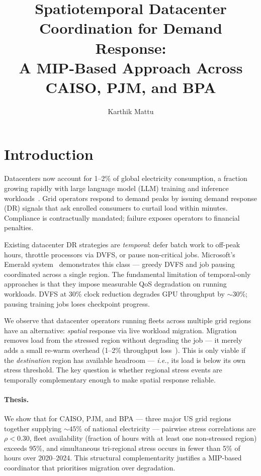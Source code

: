 \documentclass[sigplan,10pt,review]{acmart}
\title{Spatiotemporal Datacenter Coordination for Demand Response:\\
       A MIP-Based Approach Across CAISO, PJM, and BPA}
\author{Karthik Mattu}
\affiliation{\institution{Rochester Institute of Technology}}
\newcommand{\ie}{\textit{i.e.,}\xspace}
\begin{document}
\maketitle

\section{Introduction}
\label{sec:intro}

Datacenters now account for 1--2\% of global electricity consumption, a
fraction growing rapidly with large language model (LLM) training and
inference workloads~\cite{iea2024dc}.  Grid operators respond to demand peaks
by issuing demand response (DR) signals that ask enrolled consumers to curtail
load within minutes.  Compliance is contractually mandated; failure exposes
operators to financial penalties.

Existing datacenter DR strategies are \emph{temporal}: defer batch work to
off-peak hours, throttle processors via DVFS, or pause non-critical jobs.
Microsoft's Emerald system~\cite{emerald2025} demonstrates this class —
greedy DVFS and job pausing coordinated across a single region.  The
fundamental limitation of temporal-only approaches is that they impose
measurable QoS degradation on running workloads.  DVFS at 30\% clock
reduction degrades GPU throughput by ${\sim}30\%$; pausing training jobs loses
checkpoint progress.

We observe that datacenter operators running fleets across multiple grid
regions have an alternative: \emph{spatial} response via live workload
migration.  Migration removes load from the stressed region without degrading
the job — it merely adds a small re-warm overhead (1--2\% throughput
loss~\cite{trainmover2024,serverlessllm2024}).  This is only viable if the
\emph{destination} region has available headroom — \ie its load is below its
own stress threshold.  The key question is whether regional stress events are
temporally complementary enough to make spatial response reliable.

\paragraph{Thesis.}
We show that for CAISO, PJM, and BPA — three major US grid regions together
supplying ${\sim}45\%$ of national electricity — pairwise stress correlations
are $\rho < 0.30$, fleet availability (fraction of hours with at least one
non-stressed region) exceeds 95\%, and simultaneous tri-regional stress occurs
in fewer than 5\% of hours over 2020--2024.  This structural complementarity
justifies a MIP-based coordinator that prioritises migration over degradation.
\end{document}
